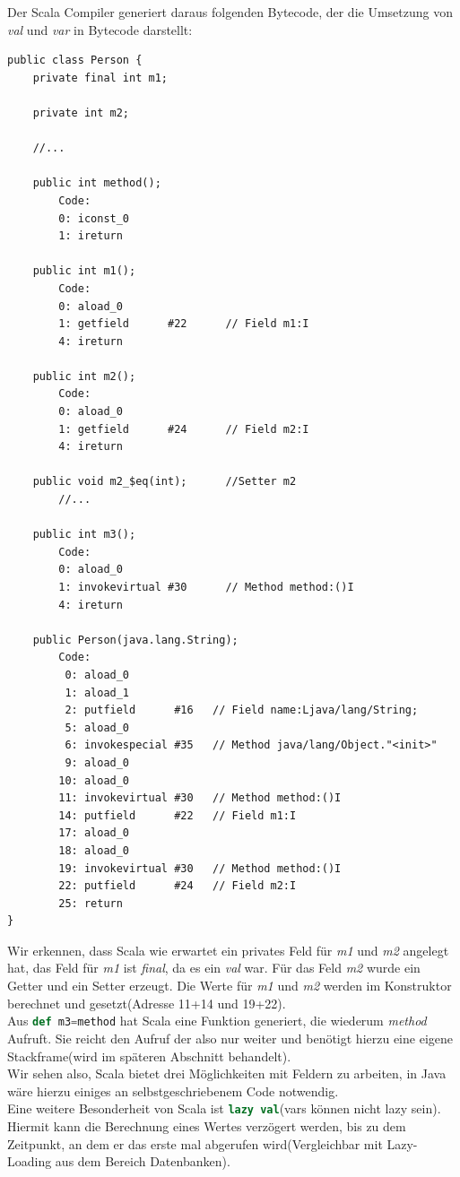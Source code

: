 \documentclass[a4paper, 11pt]{article}
\begin{document}
	  Der Scala Compiler generiert daraus folgenden Bytecode, der die Umsetzung von \textit{val} und \textit{var} in Bytecode darstellt:
	  \begin{lstlisting}[language=JVMIS]
public class Person {
	private final int m1;
	
	private int m2;
	
	//...
	
	public int method();
		Code:
		0: iconst_0
		1: ireturn
	
	public int m1();
		Code:
		0: aload_0
		1: getfield      #22      // Field m1:I
		4: ireturn
	
	public int m2();
		Code:
		0: aload_0
		1: getfield      #24      // Field m2:I
		4: ireturn
	
	public void m2_$eq(int);      //Setter m2
	    //...
	
	public int m3();
		Code:
		0: aload_0
		1: invokevirtual #30      // Method method:()I
		4: ireturn
	
	public Person(java.lang.String);
		Code:
		 0: aload_0
		 1: aload_1
		 2: putfield      #16   // Field name:Ljava/lang/String;
		 5: aload_0
	 	 6: invokespecial #35   // Method java/lang/Object."<init>"
	 	 9: aload_0
		10: aload_0
		11: invokevirtual #30   // Method method:()I
		14: putfield      #22   // Field m1:I
		17: aload_0
		18: aload_0
		19: invokevirtual #30   // Method method:()I
		22: putfield      #24   // Field m2:I
		25: return
}
	  \end{lstlisting}
	  
	  Wir erkennen, dass Scala wie erwartet ein privates Feld für \textit{m1} und \textit{m2} angelegt hat, das Feld für \textit{m1} ist \textit{final}, da es ein \textit{val} war. Für das Feld \textit{m2} wurde ein Getter und ein Setter erzeugt. 
	  Die Werte für \textit{m1} und \textit{m2} werden im Konstruktor berechnet und gesetzt(Adresse 11+14 und 19+22). \\
	  Aus \lstinline[language=Scala]|def m3=method| hat Scala eine Funktion generiert, die wiederum \textit{method} Aufruft. Sie reicht den Aufruf der also nur weiter und benötigt hierzu eine eigene Stackframe(wird im späteren Abschnitt behandelt).\\
	  Wir sehen also, Scala bietet drei Möglichkeiten mit Feldern zu arbeiten, in Java wäre hierzu einiges an selbstgeschriebenem Code notwendig. \\
	
	  Eine weitere Besonderheit von Scala ist \lstinline[language=Scala]|lazy val|(vars können nicht lazy sein). Hiermit kann die Berechnung eines Wertes verzögert werden, bis zu dem Zeitpunkt, an dem er das erste mal abgerufen wird(Vergleichbar mit Lazy-Loading aus dem Bereich Datenbanken). \\
	  
\end{document}
